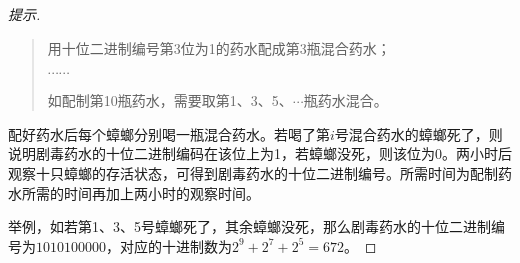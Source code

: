 \begin{proof}[提示]
\begin{quotation}
    用十位二进制编号第3位为1的药水配成第3瓶混合药水；
    
    $\cdots\cdots$

    如配制第10瓶药水，需要取第1、3、5、$\cdots$瓶药水混合。
  \end{quotation}

    配好药水后每个蟑螂分别喝一瓶混合药水。若喝了第$i$号混合药水的蟑螂死了，则说明剧毒药水的十位二进制编码在该位上为1，若蟑螂没死，则该位为0。两小时后观察十只蟑螂的存活状态，可得到剧毒药水的十位二进制编号。所需时间为配制药水所需的时间再加上两小时的观察时间。

    举例，如若第1、3、5号蟑螂死了，其余蟑螂没死，那么剧毒药水的十位二进制编号为$1010100000$，对应的十进制数为$2^9 + 2^7 + 2^5=672$。
\end{proof}